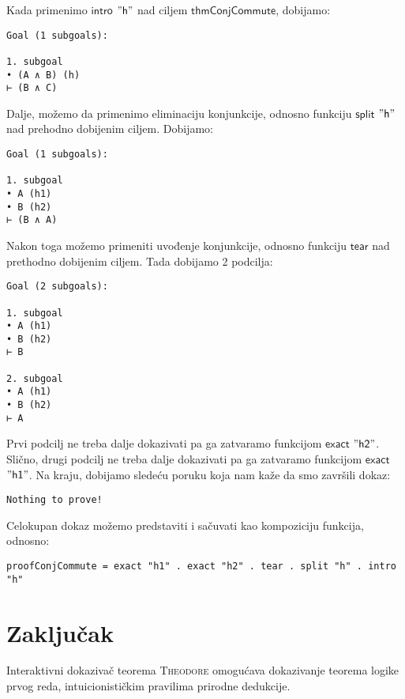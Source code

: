 \documentclass[a4paper,10pt]{article}
\theoremstyle{definition}
\begin{document}
Kada primenimo $\mathsf{intro}$ $"\mathsf{h}"$ nad ciljem $\mathsf{thmConjCommute}$, dobijamo:
\begin{verbatim}
Goal (1 subgoals):

1. subgoal
• (A ∧ B) (h)
⊢ (B ∧ C)
\end{verbatim}

Dalje, možemo da primenimo eliminaciju konjunkcije, odnosno funkciju $\mathsf{split}$ $"\mathsf{h}"$ nad prehodno dobijenim ciljem. Dobijamo:
\begin{verbatim}
Goal (1 subgoals):

1. subgoal
• A (h1)
• B (h2)
⊢ (B ∧ A)
\end{verbatim}
Nakon toga možemo primeniti uvođenje konjunkcije, odnosno funkciju $\mathsf{tear}$ nad prethodno dobijenim ciljem. Tada dobijamo 2 podcilja:
\begin{verbatim}
Goal (2 subgoals):

1. subgoal
• A (h1)
• B (h2)
⊢ B

2. subgoal
• A (h1)
• B (h2)
⊢ A
\end{verbatim}
Prvi podcilj ne treba dalje dokazivati pa ga zatvaramo funkcijom $\mathsf{exact}$ $"\mathsf{h2}"$. Slično, drugi podcilj ne treba dalje dokazivati pa ga zatvaramo funkcijom $\mathsf{exact}$ $"\mathsf{h1}"$. Na kraju, dobijamo sledeću poruku koja nam kaže da smo završili dokaz:
\begin{verbatim}
Nothing to prove!
\end{verbatim}

Celokupan dokaz možemo predstaviti i sačuvati kao kompoziciju funkcija, odnosno:
\begin{lstlisting}
proofConjCommute = exact "h1" . exact "h2" . tear . split "h" . intro "h"
\end{lstlisting}

\section{Zaklju\v cak}
\label{sec:zakljucak}

Interaktivni dokazivač teorema \textsc{Theodore} omogućava dokazivanje teorema logike prvog reda, intuicionističkim pravilima prirodne dedukcije. 

\nocite{*}
\printbibliography
\end{document}
